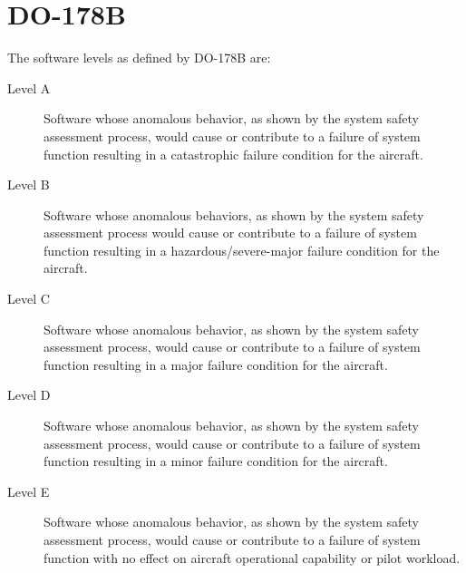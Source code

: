 \chapter{DO-178B\label{chapter:DO-178B}}
The software levels as defined by DO-178B are:
\begin{description}
\item[Level A] Software whose anomalous behavior, as shown by the system safety assessment process, would cause or contribute to a failure of system function resulting in a catastrophic failure condition for the aircraft.

\item[Level B] Software whose anomalous behaviors, as shown by the system safety assessment process would cause or contribute to a failure of system function resulting in a hazardous/severe-major failure condition for the aircraft.

\item[Level C] Software whose anomalous behavior, as shown by the system safety assessment process, would cause or contribute to a failure of system function resulting in a major failure condition for the aircraft.

\item[Level D] Software whose anomalous behavior, as shown by the system safety assessment process, would cause or contribute to a failure of system function resulting in a minor failure condition for the aircraft.

\item[Level E] Software whose anomalous behavior, as shown by the system safety assessment process, would cause or contribute to a failure of system function with no effect on aircraft operational capability or pilot workload. 
\end{description}